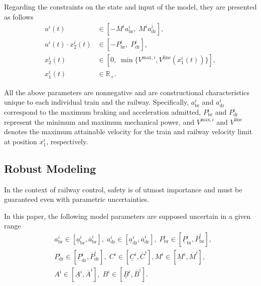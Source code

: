 \documentclass[letterpaper, 10 pt, conference]{ieeeconf}
\theoremstyle{definition}
\theoremstyle{nopoint}
\begin{document}
Regarding the constraints on the state and input of the model, they are presented as follows
%
\begin{subequations} \label{eq:modelConstraints}
    \begin{align}
        u^i(t) &\in \left[-M^i a_{\mathrm{br}}^i, \;M^i a_{\mathrm{dr}}^i \right], \label{eq:lim1} \\
         u^i(t) \cdot x_2^i(t)&\in \left[-P^i_{\mathrm{br}}, \;P^i_{\mathrm{dr}}\right], \label{eq:lim2} \\
       x_2^i(t) &\in \left[0, \;\min\{V^{\mathrm{max},i},V^{\mathrm{line}}(x_1^i(t))\}\right], \label{eq:lim5} \\
        x_1^i(t) &\in \mathbb{R}_{+}. \label{eq:lim4}  
    \end{align}
\end{subequations}
%

All the above parameters are nonnegative and are constructional characteristics unique to each individual train and the railway.  Specifically,  $a_{\mathrm{br}}^i $ and $a_{\mathrm{dr}}^i$ correspond to the maximum braking and acceleration admitted, $P^i_{\mathrm{br}}$ and $P^i_{\mathrm{dr}}$ represent the minimum and maximum mechanical power, and $V^{\mathrm{max},i}$ and $V^{\mathrm{line}}$ denotes the maximum attainable velocity for the train and railway velocity limit at position $x_1^i$, respectively.



\subsection{Robust Modeling}
\label{subsec:robustModeling}
%
In the context of railway control, safety is of utmost importance and must be guaranteed even with parametric uncertainties. 

In this paper, the following model parameters are supposed uncertain in a given range
%
\begin{eqnarray}\label{eq:train_intervals}
   &a_{\mathrm{br}}^i \in [\underline{a}_{\mathrm{br}}^i , \overline{a}_{\mathrm{br}}^i], \;
      a_{\mathrm{dr}}^i \in [\underline{a}_{\mathrm{dr}}^i , \overline{a}_{\mathrm{dr}}^i],  \;
   P^i_{\mathrm{br}} \in [\underline{P}_{\mathrm{br}}^i , \overline{P}_{\mathrm{br}}^i]  , \nonumber \\
   &P^i_{\mathrm{dr}} \in [\underline{P}_{\mathrm{dr}}^i , \overline{P}_{\mathrm{dr}}^i],   \;
   C^i \in [\underline{C}^i , \overline{C}^i ] , M^i \in [\underline{M}^i , \overline{M}^i], \;\nonumber \\
    & A^i \in [\underline{A}^i , \overline{A}^i] ,  \;
     B^i \in [\underline{B}^i , \overline{B}^i] .
\end{eqnarray}
\end{document}
